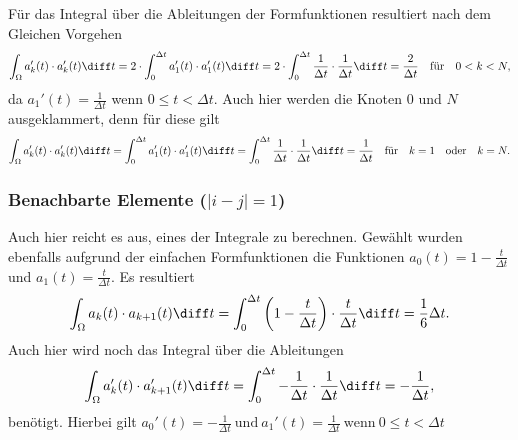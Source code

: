 Für das Integral über die Ableitungen der Formfunktionen resultiert nach dem Gleichen Vorgehen
\begin{equation}
    \int_\Omega a_k'(t) \cdot a_k'(t) \diff t 
    = 2 \cdot \int_{0}^{\Delta t} a_1'(t) \cdot a_1'(t) \diff t
    = 2 \cdot \int_{0}^{\Delta t} \frac{1}{\Delta t} \cdot \frac{1}{\Delta t} \diff t 
    = \frac{2}{\Delta t}
    \quad \text{für} \quad 0 < k < N,
\end{equation}
da $a_1'(t)= \frac{1}{\Delta t}$ wenn $0 \leq t < \Delta t$.
Auch hier werden die Knoten $0$ und $N$ ausgeklammert, denn für diese gilt
\begin{equation}
    \int_\Omega a_k'(t) \cdot a_k'(t) \diff t 
    = \int_{0}^{\Delta t} a_1'(t) \cdot a_1'(t) \diff t
    = \int_{0}^{\Delta t} \frac{1}{\Delta t} \cdot \frac{1}{\Delta t} \diff t 
    = \frac{1}{\Delta t}
    \quad \text{für} \quad k = 1 \quad \text{oder} \quad k = N.
\end{equation}

\subsubsection{Benachbarte Elemente ($|i - j| = 1$)}
Auch hier reicht es aus, eines der Integrale zu berechnen. 
Gewählt wurden ebenfalls aufgrund der einfachen Formfunktionen die Funktionen $a_0(t) = 1 - \frac{t}{\Delta t}$ und $a_1(t) = \frac{t}{\Delta t}$.
Es resultiert
\begin{equation}
    \int_\Omega a_k(t) \cdot a_{k+1}(t) \diff t = \int_{0}^{\Delta t} \left(1 - \frac{t}{\Delta t}\right) \cdot \frac{t}{\Delta t} \diff t = \frac{1}{6} \Delta t.
\end{equation}
Auch hier wird noch das Integral über die Ableitungen 
\begin{equation}
    \int_\Omega a_k'(t) \cdot a_{k+1}'(t) \diff t = \int_{0}^{\Delta t} -\frac{1}{\Delta t} \cdot \frac{1}{\Delta t} \diff t = -\frac{1}{\Delta t},
\end{equation}
benötigt.
Hierbei gilt $a_0'(t)= -\frac{1}{\Delta t} \ \text{und} \ a_1'(t)= \frac{1}{\Delta t} \ \text{wenn} \ 0 \leq t < \Delta t$

